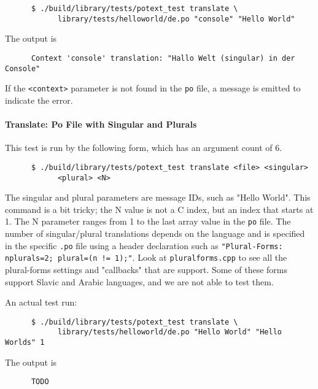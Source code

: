    \begin{verbatim}
      $ ./build/library/tests/potext_test translate \
            library/tests/helloworld/de.po "console" "Hello World"
   \end{verbatim}

   The output is

   \begin{verbatim}
      Context 'console' translation: "Hallo Welt (singular) in der Console"
   \end{verbatim}

   If the \texttt{<context>} parameter is not found in the \texttt{po}
   file, a message is emitted to indicate the error.

\paragraph{Translate: Po File with Singular and Plurals}
\label{paragraph:potext_test_translate_po_singular_plural}

   This test is run by the following form, which has an argument count
   of 6.

   \begin{verbatim}
      $ ./build/library/tests/potext_test translate <file> <singular>
            <plural> <N>
   \end{verbatim}

   The singular and plural parameters are message IDs, such as "Hello World".
   This command is a bit tricky; the N value is not a C index, but an
   index that starts at 1.
   The N parameter ranges from 1 to the last array value in
   the \texttt{po} file.
   The number of singular/plural translations depends on the language and
   is specified in the specific \texttt{.po} file using
   a header declaration such as
   \texttt{"Plural-Forms: nplurals=2; plural=(n != 1);"}.
   Look at \texttt{pluralforms.cpp} to see all the plural-forms settings and
   "callbacks" that are support.
   Some of these forms support Slavic and Arabic languages, and we are not able
   to test them.

   An actual test run:

   \begin{verbatim}
      $ ./build/library/tests/potext_test translate \
            library/tests/helloworld/de.po "Hello World" "Hello Worlds" 1
   \end{verbatim}

   The output is

   \begin{verbatim}
      TODO
   \end{verbatim}

